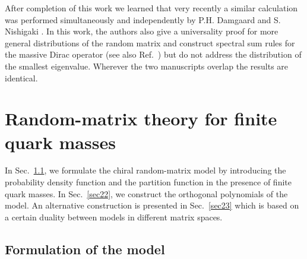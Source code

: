 After completion of this work we learned that very recently a similar
calculation was performed simultaneously and independently by P.H.
Damgaard and S. Nishigaki \cite{Damg97}.  In this work, the authors
also give a universality proof for more general distributions of the
random matrix and construct spectral sum rules for the massive Dirac
operator (see also Ref.~\cite{Damg97b}) but do not address the
distribution of the smallest eigenvalue.  Wherever the two manuscripts
overlap the results are identical.


\section{Random-matrix theory for finite quark masses} 
\label{sec2}

In Sec.~\ref{sec21}, we formulate the chiral random-matrix model by
introducing the probability density function and the partition
function in the presence of finite quark masses. In Sec.~\ref{sec22},
we construct the orthogonal polynomials of the model. An alternative
construction is presented in Sec.~\ref{sec23} which is based on a certain
duality between models in different matrix spaces.


\subsection{Formulation of the model}
\label{sec21}

